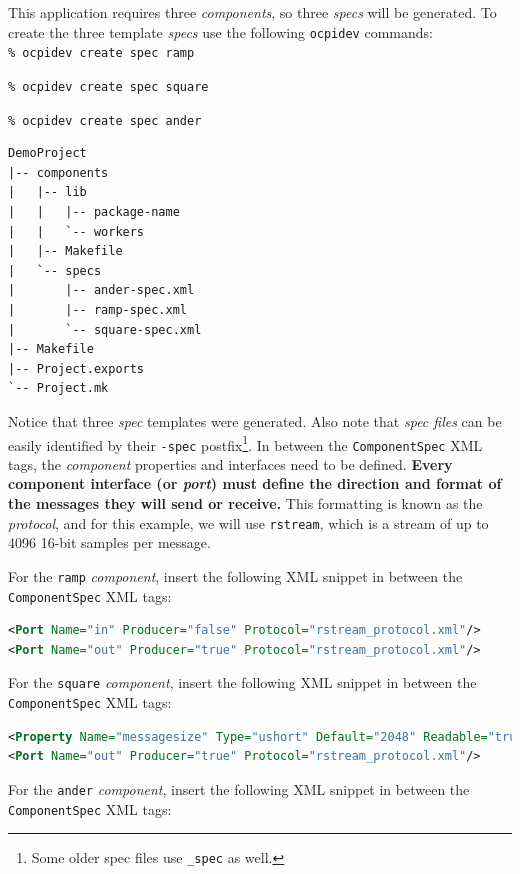 This application requires three \textit{components}, so three \textit{specs} will be generated. To create the three template \textit{specs} use the following \verb+ocpidev+ commands:\\

\forceindent\verb+% ocpidev create spec ramp+

\forceindent\verb+% ocpidev create spec square+

\forceindent\verb+% ocpidev create spec ander+\\
\bstart
\begin{verbatim}
DemoProject
|-- components
|   |-- lib
|   |   |-- package-name
|   |   `-- workers
|   |-- Makefile
|   `-- specs
|       |-- ander-spec.xml
|       |-- ramp-spec.xml
|       `-- square-spec.xml
|-- Makefile
|-- Project.exports
`-- Project.mk
\end{verbatim}
\bend
Notice that three \textit{spec} templates were generated. Also note that \textit{spec files} can be easily identified by their \verb+-spec+ postfix\footnote{Some older spec files use \texttt{\_spec} as well.}. In between the \verb+ComponentSpec+ XML tags, the \textit{component} properties and interfaces need to be defined. \textbf{Every component interface (or \textit{port}) must define the direction and format of the messages they will send or receive.} This formatting is known as the \textit{protocol}, and for this example, we will use \texttt{rstream}, which is a stream of up to 4096 16-bit samples per message.

\bstart
For the \verb+ramp+ \textit{component}, insert the following XML snippet in between the \verb+ComponentSpec+ XML tags:

\begin{lstlisting}[language=xml]
<Port Name="in" Producer="false" Protocol="rstream_protocol.xml"/>
<Port Name="out" Producer="true" Protocol="rstream_protocol.xml"/>
\end{lstlisting}
\bend
\bstart
For the \verb+square+ \textit{component}, insert the following XML snippet in between the \verb+ComponentSpec+ XML tags:

\begin{lstlisting}[language=xml]
<Property Name="messagesize" Type="ushort" Default="2048" Readable="true" Writable="true"/>
<Port Name="out" Producer="true" Protocol="rstream_protocol.xml"/>
\end{lstlisting}
\bend
\bstart
For the \verb+ander+ \textit{component}, insert the following XML snippet in between the \verb+ComponentSpec+ XML tags:

